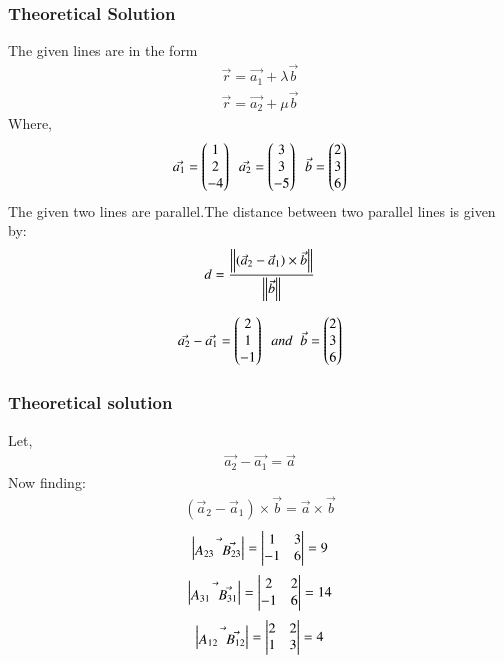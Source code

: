 \documentclass{beamer}
\begin{document}
\begin{frame}
\frametitle{Theoretical Solution}
The given lines are in the form
\begin{align}
   \Vec{r} = \Vec{a_1} + \lambda\Vec{b}\\
   \Vec{r} = \Vec{a_2} + \mu\Vec{b}
\end{align}
Where,
\begin{align}
    \Vec{a_1}=\begin{pmatrix}1\\2\\-4\end{pmatrix}\;\;\Vec{a_2}=\begin{pmatrix}3\\3\\-5\end{pmatrix}\;\;\Vec{b}=\begin{pmatrix}2\\3\\6\end{pmatrix}
\end{align}
The given two lines are parallel.The distance between two parallel lines is given by:
\begin{align}
     d = \frac{\left\lVert(\Vec{a}_2 - \Vec{a}_1) \times \Vec{b}\right\rVert}{\left\lVert\Vec{b}\right\rVert}
\end{align}

\begin{align}
   \Vec{a_2}-\Vec{a_1}=\begin{pmatrix}2\\1\\-1\end{pmatrix}\;\;and\;\;\Vec{b}=\begin{pmatrix}2\\3\\6\end{pmatrix}
\end{align}


\end{frame}
\begin{frame}
\frametitle{Theoretical solution}
Let,
\begin{align}
    \Vec{a_2}-\Vec{a_1}=\Vec{a}
\end{align}
Now finding:
\begin{align}
    (\Vec{a}_2 - \Vec{a}_1) \times \Vec{b}=\Vec{a}\times\Vec{b}
\end{align}
\begin{align}
   \begin{vmatrix}\Vec{A_{23} \;\; \Vec{B_{23}}}\end{vmatrix}=\begin{vmatrix}1&3\\-1&6\end{vmatrix}=9
\end{align}
\begin{align}
     \begin{vmatrix}\Vec{A_{31} \;\; \Vec{B_{31}}}\end{vmatrix}=\begin{vmatrix}2&2\\-1&6\end{vmatrix}=14
\end{align}
\begin{align}
     \begin{vmatrix}\Vec{A_{12} \;\; \Vec{B_{12}}}\end{vmatrix}=\begin{vmatrix}2&2\\1&3\end{vmatrix}=4
\end{align}



\end{frame}
\end{document}
